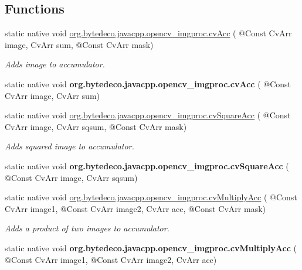 \subsection*{Functions}
\begin{DoxyCompactItemize}
\item 
static native void \hyperlink{group__imgproc__c_ga59fe63bcfa209c1ced0035aca7d47f26}{org.\+bytedeco.\+javacpp.\+opencv\+\_\+imgproc.\+cv\+Acc} ( @Const Cv\+Arr image, Cv\+Arr sum, @Const Cv\+Arr mask)
\begin{DoxyCompactList}\small\item\em Adds image to accumulator. \end{DoxyCompactList}\item 
\mbox{\label{group__imgproc__c_gae314e73a9c53d472e5faeae55ee1ddbb}} 
static native void {\bfseries org.\+bytedeco.\+javacpp.\+opencv\+\_\+imgproc.\+cv\+Acc} ( @Const Cv\+Arr image, Cv\+Arr sum)
\item 
static native void \hyperlink{group__imgproc__c_ga8c1d632da04d1ddc6e38b712f03adbe8}{org.\+bytedeco.\+javacpp.\+opencv\+\_\+imgproc.\+cv\+Square\+Acc} ( @Const Cv\+Arr image, Cv\+Arr sqsum, @Const Cv\+Arr mask)
\begin{DoxyCompactList}\small\item\em Adds squared image to accumulator. \end{DoxyCompactList}\item 
\mbox{\label{group__imgproc__c_ga91d4b23166b9d15c852be6e8c339ed70}} 
static native void {\bfseries org.\+bytedeco.\+javacpp.\+opencv\+\_\+imgproc.\+cv\+Square\+Acc} ( @Const Cv\+Arr image, Cv\+Arr sqsum)
\item 
static native void \hyperlink{group__imgproc__c_ga364a4081ca71e440b95082410d922f9c}{org.\+bytedeco.\+javacpp.\+opencv\+\_\+imgproc.\+cv\+Multiply\+Acc} ( @Const Cv\+Arr image1, @Const Cv\+Arr image2, Cv\+Arr acc, @Const Cv\+Arr mask)
\begin{DoxyCompactList}\small\item\em Adds a product of two images to accumulator. \end{DoxyCompactList}\item 
\mbox{\label{group__imgproc__c_ga94a04fc1cea7bf1751ebe7acd101a134}} 
static native void {\bfseries org.\+bytedeco.\+javacpp.\+opencv\+\_\+imgproc.\+cv\+Multiply\+Acc} ( @Const Cv\+Arr image1, @Const Cv\+Arr image2, Cv\+Arr acc)

\end{DoxyCompactItemize}

